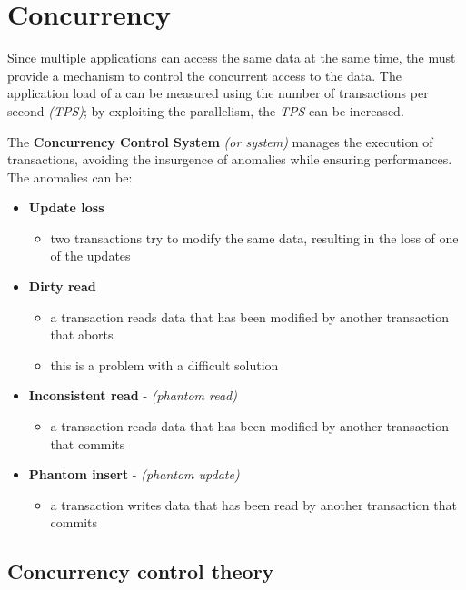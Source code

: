 \documentclass[english]{article}
\begin{document}
\clearpage

\section{Concurrency}

Since multiple applications can access the same data at the same time, the \dbms must provide a mechanism to control the concurrent access to the data.
The application load of a \dbms can be measured using the number of transactions per second \textit{(TPS)};
by exploiting the parallelism, the \textit{TPS} can be increased.

The \textbf{Concurrency Control System} \textit{(or \cc system)} manages the execution of transactions, avoiding the insurgence of anomalies while ensuring performances.
The anomalies can be:

\begin{itemize}
  \item \textbf{Update loss}
        \begin{itemize}
          \item two transactions try to modify the same data, resulting in the loss of one of the updates
        \end{itemize}
  \item \textbf{Dirty read}
        \begin{itemize}
          \item a transaction reads data that has been modified by another transaction that aborts
          \item this is a problem with a difficult solution
        \end{itemize}
  \item \textbf{Inconsistent read} - \textit{(phantom read)}
        \begin{itemize}
          \item a transaction reads data that has been modified by another transaction that commits
        \end{itemize}
  \item \textbf{Phantom insert} - \textit{(phantom update)}
        \begin{itemize}
          \item a transaction writes data that has been read by another transaction that commits
        \end{itemize}
\end{itemize}

\subsection{Concurrency control theory}
\end{document}
